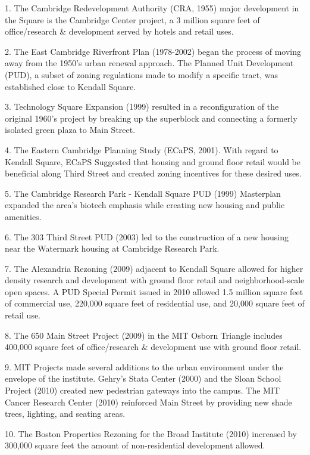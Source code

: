 {{        1. The Cambridge Redevelopment Authority (CRA, 1955) major development in the Square is the Cambridge Center project, a 3 million square feet of office/research \& development served by hotels and retail uses.

        2. The East Cambridge Riverfront Plan (1978-2002) began the process of moving away from the 1950's urban renewal approach. The Planned Unit Development (PUD), a subset of zoning regulations made to modify a specific tract, was established close to Kendall Square.

        3. Technology Square Expansion (1999) resulted in a reconfiguration of the original 1960's project by breaking up the superblock and connecting a formerly isolated green plaza to Main Street.

        4. The Eastern Cambridge Planning Study (ECaPS, 2001). With regard to Kendall Square, ECaPS Suggested that housing and ground floor retail would be beneficial along Third Street and created zoning incentives for these desired uses.

        5. The Cambridge Research Park - Kendall Square PUD (1999) Masterplan expanded the area's biotech emphasis while creating new housing and public amenities.

        6. The 303 Third Street PUD (2003) led to the construction of a new housing near the Watermark housing at Cambridge Research Park.

        7. The Alexandria Rezoning (2009) adjacent to Kendall Square allowed for higher density research and development with ground floor retail and neighborhood-scale open spaces. A PUD Special Permit issued in 2010 allowed 1.5 million square feet of commercial use, 220,000 square feet of residential use, and 20,000 square feet of retail use.

        8. The 650 Main Street Project (2009) in the MIT Osborn Triangle includes 400,000 square feet of office/research \& development use with ground floor retail.

        9. MIT Projects made several additions to the urban environment under the envelope of the institute. Gehry's Stata Center (2000) and the Sloan School Project (2010) created new pedestrian gateways into the campus. The MIT Cancer Research Center (2010) reinforced Main Street by providing new shade trees, lighting, and seating areas.

        10. The Boston Properties Rezoning for the Broad Institute (2010) increased by 300,000 square feet the amount of non-residential development allowed.
    }


}

